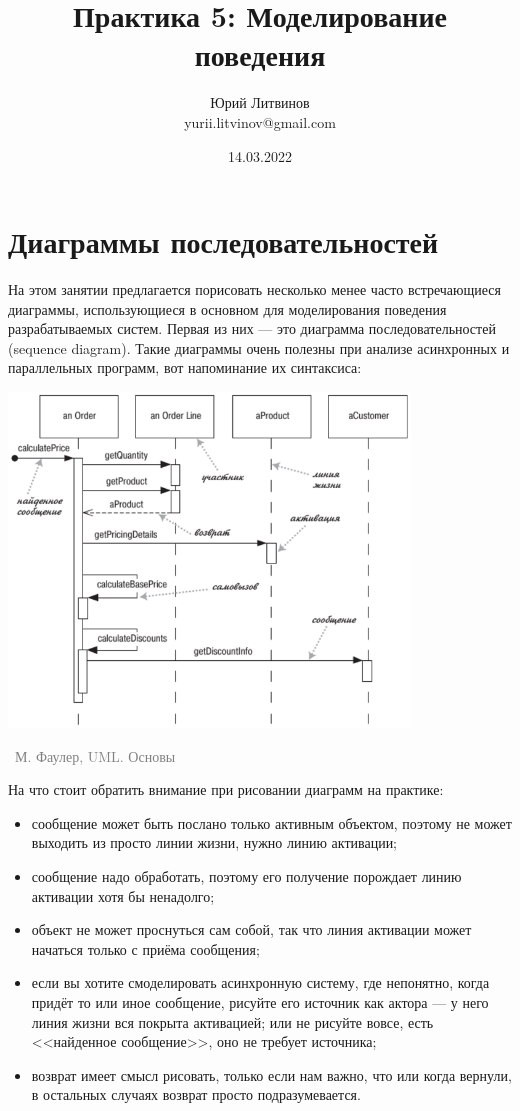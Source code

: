 \documentclass[a5paper]{article}
\title{Практика 5: Моделирование поведения}
\author{Юрий Литвинов\\\small{yurii.litvinov@gmail.com}}
\date{14.03.2022}
\newcommand{\attribution}[1] {
    \vspace{-5mm}\begin{flushright}\begin{scriptsize}\textcolor{gray}{\textcopyright\, #1}\end{scriptsize}\end{flushright}
}
\begin{document}
\maketitle
\thispagestyle{empty}

\section{Диаграммы последовательностей}

На этом занятии предлагается порисовать несколько менее часто встречающиеся диаграммы, использующиеся в основном для моделирования поведения разрабатываемых систем. Первая из них --- это диаграмма последовательностей (sequence diagram). Такие диаграммы очень полезны при анализе асинхронных и параллельных программ, вот напоминание их синтаксиса:

\begin{center}
    \includegraphics[width=0.8\textwidth]{sequenceDiagram.png}
    \attribution{М. Фаулер, UML. Основы}
\end{center}

На что стоит обратить внимание при рисовании диаграмм на практике:

\begin{itemize}
    \item сообщение может быть послано только активным объектом, поэтому не может выходить из просто линии жизни, нужно линию активации;
    \item сообщение надо обработать, поэтому его получение порождает линию активации хотя бы ненадолго;
    \item объект не может проснуться сам собой, так что линия активации может начаться только с приёма сообщения;
    \item если вы хотите смоделировать асинхронную систему, где непонятно, когда придёт то или иное сообщение, рисуйте его источник как актора --- у него линия жизни вся покрыта активацией; или не рисуйте вовсе, есть <<найденное сообщение>>, оно не требует источника;
    \item возврат имеет смысл рисовать, только если нам важно, что или когда вернули, в остальных случаях возврат просто подразумевается.
\end{itemize}
\end{document}

